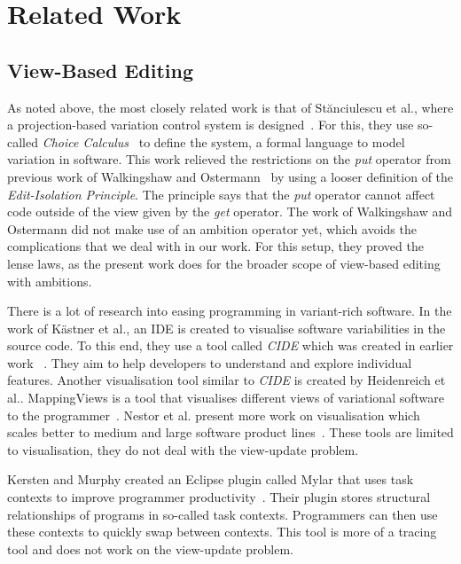 \chapter{Related Work}\label{sec:relatedwork}
\section{View-Based Editing}
As noted above, the most closely related work is that of St{\u{a}}nciulescu
et al., where a projection-based variation control system is designed~\cite{stuanciulescu2016}.
For this, they use so-called \emph{Choice Calculus}~\cite{walkingshaw2012} to
define the system, a formal language to model variation in software.
This work relieved the restrictions on the \emph{put} operator from previous
work of Walkingshaw and Ostermann~\cite{walkingshaw2014} by using a looser
definition of the \emph{Edit-Isolation Principle}. The principle says that 
the \emph{put} operator cannot affect code outside of the view given by the
\emph{get} operator. The work of Walkingshaw and Ostermann did not make use
of an ambition operator yet, which avoids the complications that we deal with 
in our work. For this setup, they proved the lense laws, as the present work 
does for the broader scope of view-based editing with ambitions.

There is a lot of research into easing programming in variant-rich software.
In the work of K{\"a}stner et al., an IDE is created to visualise software
variabilities in the source code. To this end, they use a tool called
\emph{CIDE} which was created in earlier work ~\cite{kastner2008, kastner2008granularity}.
They aim to help developers to understand and explore individual features.
Another visualisation tool similar to \emph{CIDE} is created by Heidenreich
et al.. MappingViews is a tool that visualises different views of variational
software to the programmer~\cite{heidenreich2008}. Nestor et al. present more
work on visualisation which scales better to medium and large software product
lines~\cite{nestor2007visualisation}. These tools are limited to visualisation,
they do not deal with the view-update problem.

Kersten and Murphy created an Eclipse plugin called Mylar that uses task
contexts to improve programmer productivity~\cite{kersten2006using}. Their
plugin stores structural relationships of programs in so-called task contexts.
Programmers can then use these contexts to quickly swap between contexts. This
tool is more of a tracing tool and does not work on the view-update problem.

